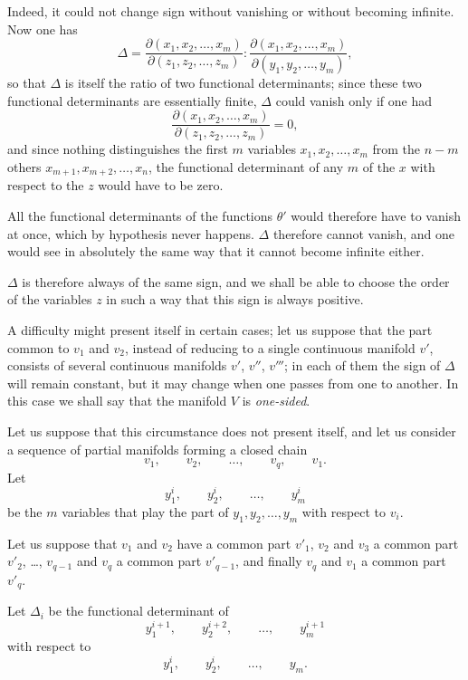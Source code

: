 \documentclass{article}
\begin{document}
Indeed, it could not change sign without vanishing or without becoming
infinite. Now one has
\[
\Delta = \frac{\partial(x_{1}, x_{2}, \ldots, x_{m})}{\partial(z_{1}, z_{2}, \ldots, z_{m})} : \frac{\partial(x_{1}, x_{2}, \ldots, x_{m})}{\partial(y_{1}, y_{2}, \ldots, y_{m})},
\]
so that $\Delta$ is itself the ratio of two functional determinants; since these two functional determinants are essentially finite, $\Delta$ could vanish only if one had
\[
\frac{\partial(x_{1}, x_{2}, \ldots, x_{m})}{\partial(z_{1}, z_{2}, \ldots, z_{m})} = 0,
\]
and since nothing distinguishes the first $m$ variables $x_{1}, x_{2}, \ldots, x_{m}$ from the $n - m$ others $x_{m+1}, x_{m+2}, \ldots, x_{n}$, the functional determinant of any $m$ of the $x$ with respect to the $z$ would have to be zero.

All the functional determinants of the functions $\theta'$ would therefore have to vanish at once, which by hypothesis never happens. $\Delta$ therefore cannot vanish, and one would see in absolutely the same way that it cannot become infinite either.

$\Delta$ is therefore always of the same sign, and we shall be able to choose the order of the variables $z$ in such a way that this sign is always positive.

A difficulty might present itself in certain cases; let us suppose that the part common to $v_{1}$ and $v_{2}$, instead of reducing to a single continuous manifold $v'$, consists of several continuous manifolds $v'$, $v''$, $v'''$; in each of them the sign of $\Delta$ will remain constant, but it may change when one passes from one to another. In this case we shall say that the manifold $V$ is \emph{one-sided}.

Let us suppose that this circumstance does not present itself, and let us consider a sequence of partial manifolds forming a closed chain
\[
v_{1}, \qquad v_{2}, \qquad \ldots, \qquad v_{q}, \qquad v_{1}.
\]
Let
\[
y^{i}_{1}, \qquad y^{i}_{2}, \qquad \ldots, \qquad y^{i}_{m}
\]
be the $m$ variables that play the part of $y_{1}, y_{2}, \ldots, y_{m}$ with respect to $v_{i}$.

Let us suppose that $v_{1}$ and $v_{2}$ have a common part $v'_{1}$, $v_{2}$ and $v_{3}$ a common part $v'_{2}$, \ldots, $v_{q-1}$ and $v_{q}$ a common part $v'_{q-1}$, and finally $v_{q}$ and $v_{1}$ a common part $v'_{q}$.

Let $\Delta_{i}$ be the functional determinant of
\[
y^{i+1}_{1}, \qquad y^{i+2}_{2}, \qquad \ldots, \qquad y^{i+1}_{m}
\]
with respect to
\[
y^{i}_{1}, \qquad y^{i}_{2}, \qquad \ldots, \qquad y_{m}.
\]
\end{document}
